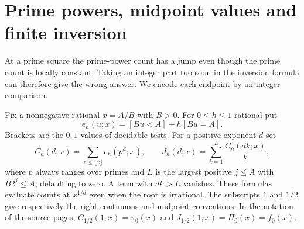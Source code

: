 \section{Prime powers, midpoint values and finite inversion}
\label{sec:powers}
At a prime square the prime-power count has a jump even though the prime count is locally constant. Taking an integer part too soon in the inversion formula can therefore give the wrong answer. We encode each endpoint by an integer comparison.

Fix a nonnegative rational $x=A/B$ with $B>0$. For $0\le h\le1$ rational put
\[
 e_h(u;x)=[Bu<A]+h[Bu=A].
\]
Brackets are the $0,1$ values of decidable tests. For a positive exponent $d$ set
\[
 C_h(d;x)=\sum_{p\le\lfloor x\rfloor} e_h(p^d;x),\qquad
 J_h(d;x)=\sum_{k=1}^{L}\frac{C_h(dk;x)}{k},
\]
where $p$ always ranges over primes and $L$ is the largest positive $j\le A$ with $B2^j\le A$, defaulting to zero. A term with $dk>L$ vanishes. These formulas evaluate counts at $x^{1/d}$ even when the root is irrational. The subscripts $1$ and $1/2$ give respectively the right-continuous and midpoint conventions. In the notation of the source pages, $C_{1/2}(1;x)=\pi_0(x)$ and $J_{1/2}(1;x)=\Pi_0(x)=f_0(x)$.

